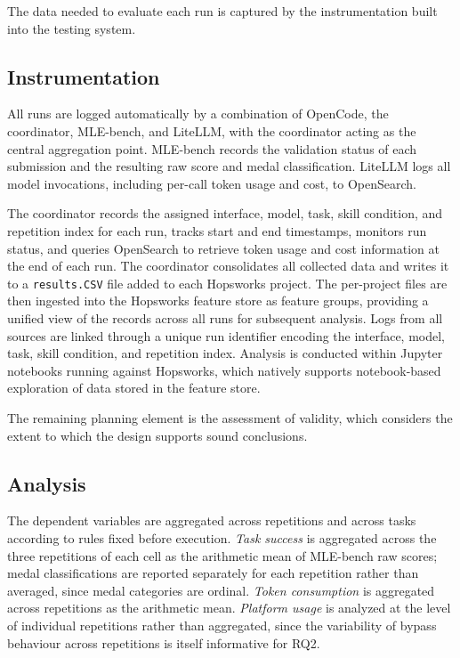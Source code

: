 \documentclass[
english,                 %
bibtex,                  %
includeExtraAbstracts, %
]{kththesis}
\numberwithin{listing}{chapter}
\begin{document}
The data needed to evaluate each run is captured by the instrumentation built into the testing system.

\subsection{Instrumentation}

All runs are logged automatically by a combination of OpenCode, the coordinator, \gls{MLE}-bench, and Lite\gls{LLM}, with the coordinator acting as the central aggregation point. \gls{MLE}-bench records the validation status of each submission and the resulting raw score and medal classification. Lite\gls{LLM} logs all model invocations, including per-call token usage and cost, to OpenSearch.

The coordinator records the assigned interface, model, task, skill condition, and repetition index for each run, tracks start and end timestamps, monitors run status, and queries OpenSearch to retrieve token usage and cost information at the end of each run. The coordinator consolidates all collected data and writes it to a \texttt{results.\gls{CSV}} file added to each Hopsworks project. The per-project files are then ingested into the Hopsworks feature store as feature groups, providing a unified view of the records across all runs for subsequent analysis. Logs from all sources are linked through a unique run identifier encoding the interface, model, task, skill condition, and repetition index. Analysis is conducted within Jupyter notebooks running against Hopsworks, which natively supports notebook-based exploration of data stored in the feature store.

The remaining planning element is the assessment of validity, which considers the extent to which the design supports sound conclusions.

\subsection{Analysis}

The dependent variables are aggregated across repetitions and across tasks according to rules fixed before execution. \emph{Task success} is aggregated across the three repetitions of each cell as the arithmetic mean of \gls{MLE}-bench raw scores; medal classifications are reported separately for each repetition rather than averaged, since medal categories are ordinal. \emph{Token consumption} is aggregated across repetitions as the arithmetic mean. \emph{Platform usage} is analyzed at the level of individual repetitions rather than aggregated, since the variability of bypass behaviour across repetitions is itself informative for \gls{RQ}2.
\end{document}
